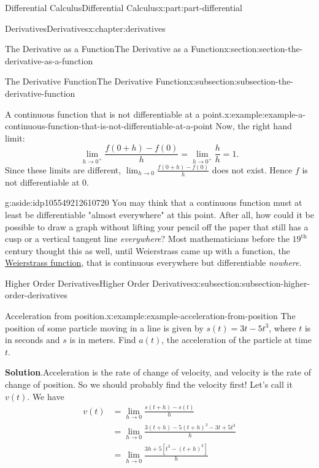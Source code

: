 \documentclass[twoside,10pt,]{book}
\newcommand{\blocktitlefont}{\relax}
\numberwithin{equation}{part}
\begin{document}
\begin{partptx}{Differential Calculus}{}{Differential Calculus}{}{}{x:part:part-differential}
\begin{chapterptx}{Derivatives}{}{Derivatives}{}{}{x:chapter:derivatives}
\begin{sectionptx}{The Derivative as a Function}{}{The Derivative as a Function}{}{}{x:section:section-the-derivative-as-a-function}
\begin{subsectionptx}{The Derivative Function}{}{The Derivative Function}{}{}{x:subsection:subsection-the-derivative-function}
\begin{example}{A continuous function that is not differentiable at a point.}{x:example:example-a-continuous-function-that-is-not-differentiable-at-a-point}
Now, the right hand limit:%
\begin{equation*}
\lim_{h\to0^{+}}\frac{f(0+h)-f(0)}{h} = \lim_{h\to0^{+}}\frac{h}{h} = 1.
\end{equation*}
Since these limits are different, \(\lim_{h\to0}\frac{f(0+h)-f(0)}{h}\) does not exist. Hence \(f\) is not differentiable at \(0\).%
\end{example}
\begin{aside}{}{g:aside:idp105549212610720}%
You may think that a continuous function must at least be differentiable "almost everywhere" at this point. After all, how could it be possible to draw a graph without lifting your pencil off the paper that still has a cusp or a vertical tangent line \emph{everywhere}? Most mathematicians before the \(19^{\text{th}}\) century thought this as well, until Weierstrass came up with a function, the \href{https://en.wikipedia.org/wiki/Weierstrass_function}{Weierstrass function}\footnotemark{}, that is continuous everywhere but differentiable \emph{nowhere}.%
\end{aside}
%
\end{subsectionptx}
%
%
\typeout{************************************************}
\typeout{************************************************}
%
\begin{subsectionptx}{Higher Order Derivatives}{}{Higher Order Derivatives}{}{}{x:subsection:subsection-higher-order-derivatives}
\begin{example}{Acceleration from position.}{x:example:example-acceleration-from-position}%
The position of some particle moving in a line is given by \(s(t) = 3t-5t^{3}\), where \(t\) is in seconds and \(s\) is in meters. Find \(a(t)\), the acceleration of the particle at time \(t\).%
\par\smallskip%
\noindent\textbf{\blocktitlefont Solution}.\hypertarget{g:solution:idp105549212616992}{}\quad{}Acceleration is the rate of change of velocity, and velocity is the rate of change of position. So we should probably find the velocity first! Let's call it \(v(t)\). We have%
\begin{align*}
v(t) & = \lim_{h\to0}\frac{s(t+h) - s(t)}{h} \\
& = \lim_{h\to0}\frac{3(t+h) - 5(t+h)^{3} - 3t + 5t^{3}}{h} \\
& = \lim_{h\to0}\frac{3h + 5[t^{3} - (t+h)^{3}]}{h} \\

\end{align*}
\end{example}
\end{subsectionptx}
\end{sectionptx}
\end{chapterptx}
\end{partptx}
\end{document}
